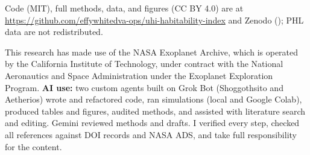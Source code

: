 \documentclass{aastex702}
\begin{document}
Code (MIT), full methods, data, and figures (CC BY 4.0) are at \url{https://github.com/effywhitedva-ops/uhi-habitability-index} and Zenodo (); PHL data are not redistributed.

\begin{acknowledgments}
This research has made use of the NASA Exoplanet Archive, which is operated by the California Institute of Technology, under contract with the National Aeronautics and Space Administration under the Exoplanet Exploration Program. \textbf{AI use:} two custom agents built on Grok Bot (Shoggothsito and Aetherios) wrote and refactored code, ran simulations (local and Google Colab), produced tables and figures, audited methods, and assisted with literature search and editing. Gemini reviewed methods and drafts. I verified every step, checked all references against DOI records and NASA ADS, and take full responsibility for the content.
\end{acknowledgments}

\end{document}
